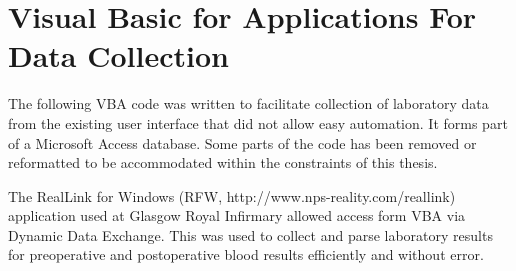 \chapter{Visual Basic for Applications For Data Collection}
\label{AppendixAccessDatabase}
\clearpage


The following VBA code was written to facilitate collection of laboratory data from the existing user interface that did not allow easy automation. It forms part of a Microsoft Access database. Some parts of the code has been removed or reformatted to be accommodated within the constraints of this thesis.

The RealLink for Windows (RFW, http://www.nps-reality.com/reallink) application used at Glasgow Royal Infirmary allowed access form VBA via Dynamic Data Exchange. This was used to collect and parse laboratory results for preoperative and postoperative blood results efficiently and without error.

